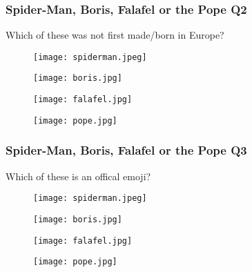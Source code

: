 \documentclass{beamer}
\begin{document}
\begin{frame}
\frametitle{Spider-Man, Boris, Falafel or the Pope Q2}
Which of these was not first made/born in Europe?
\begin{figure}[!htb]
    \centering
    \begin{minipage}{.5\textwidth}
        \centering
        \texttt{[image: spiderman.jpeg]}
        
    \end{minipage}%
    \begin{minipage}{0.5\textwidth}
        \centering
        \texttt{[image: boris.jpg]}
        
    \end{minipage}
\end{figure}
\begin{figure}[!htb]
    \centering
    \begin{minipage}{.5\textwidth}
        \centering
        \texttt{[image: falafel.jpg]}
        
    \end{minipage}%
    \begin{minipage}{0.5\textwidth}
        \centering
        \texttt{[image: pope.jpg]}
        
    \end{minipage}
\end{figure}
\end{frame}

\begin{frame}
\frametitle{Spider-Man, Boris, Falafel or the Pope Q3}
Which of these is an offical emoji?
\begin{figure}[!htb]
    \centering
    \begin{minipage}{.5\textwidth}
        \centering
        \texttt{[image: spiderman.jpeg]}
        
    \end{minipage}%
    \begin{minipage}{0.5\textwidth}
        \centering
        \texttt{[image: boris.jpg]}
        
    \end{minipage}
\end{figure}
\begin{figure}[!htb]
    \centering
    \begin{minipage}{.5\textwidth}
        \centering
        \texttt{[image: falafel.jpg]}
        
    \end{minipage}%
    \begin{minipage}{0.5\textwidth}
        \centering
        \texttt{[image: pope.jpg]}
        
    \end{minipage}
\end{figure}
\end{frame}
\end{document}
